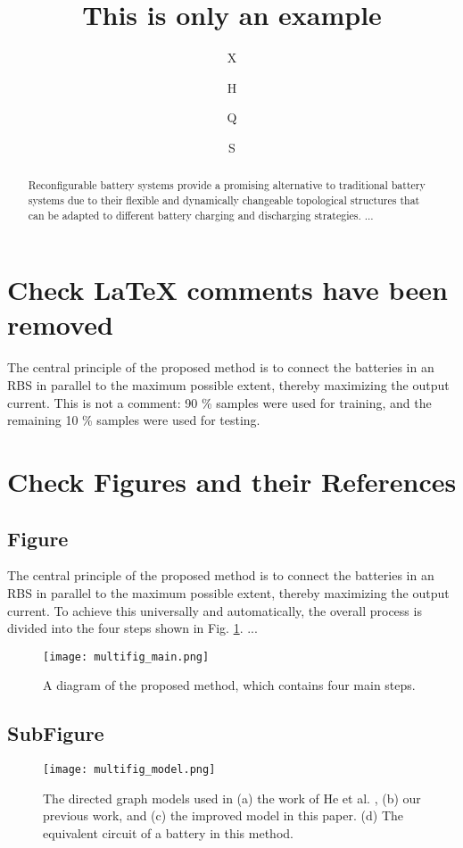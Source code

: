 \documentclass[a4paper]{article}
\title{This is only an example}
\author[1$\dag$]{X}
\author[1$\dag$]{H}
\author[1*]{Q}
\author[1,2]{S}
\affil[1]{School of R, China}
\affil[2]{School of A, China}
\affil[*]{Address correspondence to: email}
\affil[$\dag$]{These authors contributed equally to this work.}
\begin{document}
\maketitle

\begin{abstract}
Reconfigurable battery systems provide a promising alternative to traditional battery systems due to their flexible and dynamically changeable topological structures that can be adapted to different battery charging and discharging strategies.
...
\end{abstract}

\section{Check LaTeX comments have been removed}

The central principle of the proposed method is to connect the batteries in an RBS in parallel to the maximum possible extent, thereby maximizing the output current. 
This is not a comment: 90 \% samples were used for training, and the remaining 10 \% samples were used for testing.

\section{Check Figures and their References}

\subsection{Figure}

The central principle of the proposed method is to connect the batteries in an RBS in parallel to the maximum possible extent, thereby maximizing the output current.
To achieve this universally and automatically, the overall process is divided into the four steps shown in Fig. \ref{multifig:multifig_main}.
...


\begin{figure}[htbp]
    \centering
    \texttt{[image: multifig\_main.png]}
    \caption{
        A diagram of the proposed method, which contains four main steps.
    }
    \label{multifig:multifig_main}
\end{figure}


\subsection{SubFigure}


\begin{figure}[htbp]
    \centering
    \texttt{[image: multifig\_model.png]}
    \caption{
        The directed graph models used in (a) the work of He et al. \cite{heExploringAdaptiveReconfiguration2013}, (b) our previous work, and (c) the improved model in this paper.
        (d) The equivalent circuit of a battery in this method.
    }
    \label{multifig:multifig_model}
\end{figure}
\end{document}
